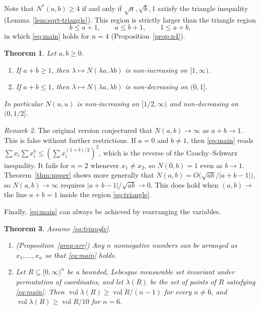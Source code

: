 \documentclass[11pt]{article}
\newtheorem{theorem}{Theorem}[section]
\theoremstyle{remark}
\newtheorem{remark}[theorem]{Remark}
\numberwithin{equation}{section}
\begin{document}
Note that $N^*(a,b)\ge 4$ if and only if $\sqrt a,\sqrt b,1$ satisfy the triangle inequality
(Lemma~\ref{lem:sqrt-triangle}). This region is strictly larger than the triangle region
\begin{equation}\label{eq:triangle}
b\le a+1,\qquad a\le b+1,\qquad 1\le a+b,
\end{equation}
in which \eqref{eq:main} holds for $n=4$ (Proposition~\ref{prop:n4}).

\begin{theorem}\label{thm:rays}
Let $a,b\ge 0$.
\begin{enumerate}[label=(\roman*)]
\item If $a+b\ge 1$, then $\lambda\mapsto N(\lambda a,\lambda b)$ is non-increasing on $[1,\infty)$.
\item If $a+b\le 1$, then $\lambda\mapsto N(\lambda a,\lambda b)$ is non-decreasing on $(0,1]$.
\end{enumerate}
In particular $N(u,u)$ is non-increasing on $[1/2,\infty)$ and non-decreasing on $(0,1/2]$.
\end{theorem}

\begin{remark}
The original version conjectured that $N(a,b)\to\infty$ as $a+b\to 1$. This is false without
further restrictions. If $a=0$ and $b\ne1$, then \eqref{eq:main} reads
$\sum x_i\sum x_i^b\le(\sum x_i^{(1+b)/2})^2$, which is the reverse of the Cauchy--Schwarz
inequality. It fails for $n=2$ whenever $x_1\ne x_2$, so $N(0,b)=1$ even as $b\to 1$.
Theorem~\ref{thm:upper} shows more generally that $N(a,b)=O\big(\sqrt{ab}/|a+b-1|\big)$, so
$N(a,b)\to\infty$ requires $|a+b-1|/\sqrt{ab}\to 0$. This does hold when $(a,b)\to$ the line
$a+b=1$ inside the region \eqref{eq:triangle}.
\end{remark}

Finally, \eqref{eq:main} can always be achieved by rearranging the variables.

\begin{theorem}\label{thm:arrangement}
Assume \eqref{eq:triangle}.
\begin{enumerate}[label=(\roman*)]
\item (Proposition~\ref{prop:arr}) Any $n$ nonnegative numbers can be arranged as
$x_1,\dots,x_n$ so that \eqref{eq:main} holds.
\item Let $R\subseteq[0,\infty)^n$ be a bounded, Lebesgue measurable set invariant under
permutation of coordinates, and let $\lambda(R)$ be the set of points of $R$ satisfying
\eqref{eq:main}. Then $\operatorname{vol}\lambda(R)\ge \operatorname{vol}R/(n-1)$ for every
$n\ne 6$, and $\operatorname{vol}\lambda(R)\ge \operatorname{vol}R/10$ for $n=6$.
\end{enumerate}
\end{theorem}
\end{document}
